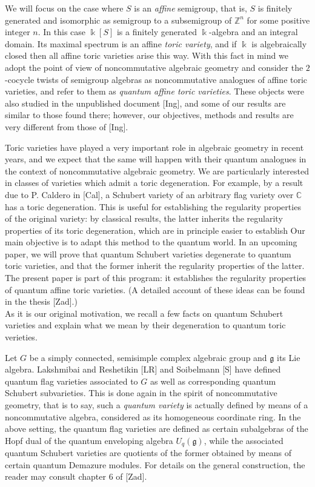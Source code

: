 \documentclass[twoside,11pt]{article}
\renewcommand{\k}{\Bbbk}
\newcommand{\Z}{{\mathbb Z}}
\newcommand{\C}{{\mathbb C}}
\newcommand{\g}{{\mathfrak g}}
\begin{document}
We will focus on the case where $S$ is an \emph{affine} semigroup, that is, $S$ is
finitely generated and isomorphic as semigroup to a subsemigroup of $\Z^n$ for some
positive integer $n$. In this case $\k[S]$ is a finitely generated $\k$-algebra and an
integral domain. Its maximal spectrum is an affine \emph{toric variety}, and if $\k$ is
algebraically closed then all affine toric varieties arise this way. With this fact in
mind we adopt the point of view of noncommutative algebraic geometry and consider the
$2$-cocycle twists of semigroup algebras as noncommutative analogues of affine toric
varieties, and refer to them as \emph{quantum affine toric varieties}. These objects 
were also studied in the unpublished document [Ing], and some of our results are
similar to those found there; however, our objectives, methods and results are very
different from those of [Ing].

Toric varieties have played a very important role in algebraic geometry in recent years,
and we expect that the same will happen with their quantum analogues in the context of 
noncommutative algebraic geometry.
We are particularly interested in classes of varieties which admit a toric degeneration. 
For example, by a result due to P. Caldero in [Cal], a 
Schubert variety of an arbitrary flag variety over $\C$ has a toric degeneration. 
This is useful for establishing the regularity properties of the original variety: by classical results, the latter
inherits the regularity properties of its toric degeneration, which are in principle easier to establish
Our main objective is to adapt this method to the quantum world. In an upcoming paper, we will prove that quantum 
Schubert varieties degenerate to quantum toric varieties, and that the former inherit the regularity
properties of the latter. The present paper is part of this program: it establishes the regularity properties of 
quantum affine toric varieties. 
(A detailed account of these ideas can be found in the thesis [Zad].)\\

As it is our original motivation, we recall a few facts on quantum Schubert varieties and explain what we mean by
their degeneration to quantum toric verieties.
 
Let $G$ be a simply connected, semisimple complex algebraic group and $\g$ its Lie
algebra. Lakshmibai and Reshetikin [LR] and Soibelmann [S] have defined quantum flag
varieties associated to $G$ as well as corresponding quantum Schubert subvarieties. This
is done again in the spirit of noncommutative geometry, that is to say, such a
\emph{quantum variety} is actually defined by means of a noncommutative algebra,
considered as its homogeneous coordinate ring. In the above setting, the quantum flag
varieties are defined as certain subalgebras of the Hopf dual of the quantum enveloping
algebra $U_q(\g)$, while the associated quantum Schubert varieties are quotients of the
former obtained by means of certain quantum Demazure modules. For details on the general
construction, the reader may consult chapter 6 of [Zad].
\end{document}
